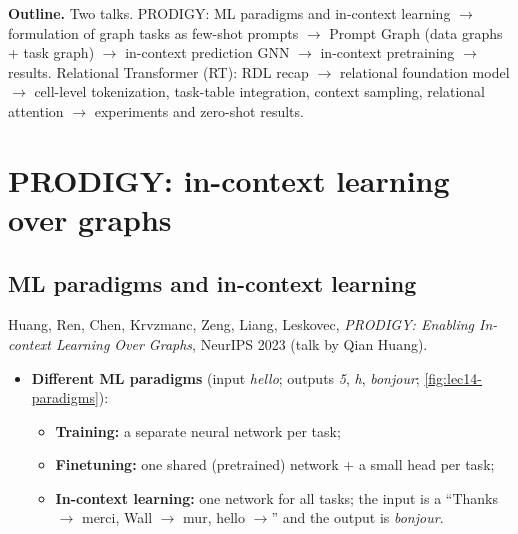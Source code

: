 \textbf{Outline.} Two talks. PRODIGY: ML paradigms and in-context learning $\to$
formulation of graph tasks as few-shot prompts $\to$ Prompt Graph (data graphs + task
graph) $\to$ in-context prediction GNN $\to$ in-context pretraining $\to$ results.
Relational Transformer (RT): RDL recap $\to$ relational foundation model $\to$ cell-level
tokenization, task-table integration, context sampling, relational attention $\to$
experiments and zero-shot results.

\section{PRODIGY: in-context learning over graphs}\label{sec:lec14-prodigy}

\subsection{ML paradigms and in-context learning}\label{sec:lec14-icl}

Huang, Ren, Chen, Krvzmanc, Zeng, Liang, Leskovec, \emph{PRODIGY: Enabling In-context
Learning Over Graphs}, NeurIPS 2023 (talk by Qian Huang).
\begin{itemize}
  \item \textbf{Different ML paradigms} (input \emph{hello}; outputs \emph{5}, \emph{h},
    \emph{bonjour}; \cref{fig:lec14-paradigms}):
    \begin{itemize}
      \item \textbf{Training:} a separate neural network per task;
      \item \textbf{Finetuning:} one shared (pretrained) network + a small head per task;
      \item \textbf{In-context learning:} one network for all tasks; the input is a
         ``Thanks $\to$ merci, Wall $\to$ mur, hello $\to$'' and the
        output is \emph{bonjour}.
    \end{itemize}
\end{itemize}


